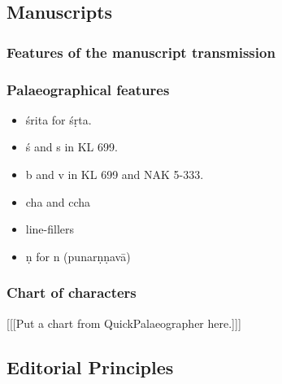 
\subsection{Manuscripts}

\subsubsection{Features of the manuscript transmission}

\subsubsection{Palaeographical features}
\begin{itemize}
    \item śrita for śṛta.
    \item ś and s in KL 699.
    \item b and v in KL 699 and NAK 5-333.
    \item cha and ccha
    \item line-fillers
    \item \d n for n (punar\d n\d nav\=a)
\end{itemize}

\subsubsection{Chart of characters}

[[[Put a chart from QuickPalaeographer here.]]]

   
\subsection{Editorial Principles}

